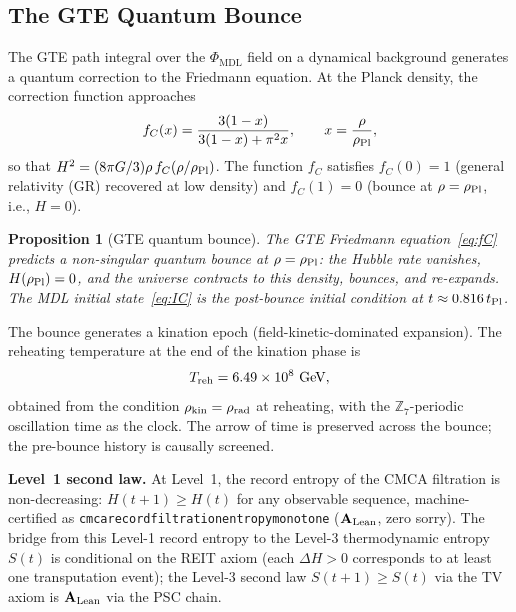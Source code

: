 \documentclass[11pt]{article}
\newtheorem{proposition}[theorem]{Proposition}
\theoremstyle{remark}
\newcommand{\PHIMDL}{\Phi_{\mathrm{MDL}}}
\newcommand{\ZS}{\mathbb{Z}_7}
\newcommand{\lean}[1]{%
  \penalty-100
  \begingroup\def\_{\textunderscore\allowbreak}\texttt{#1}\endgroup}
\newcommand{\rhoPl}{\rho_{\rm Pl}}
\newcommand{\CatAL}{\ensuremath{\textbf{A}_{\rm Lean}}}
\begin{document}
\subsection{The GTE Quantum Bounce}
\label{sec:bounce}

The GTE path integral over the $\PHIMDL$ field on a dynamical background generates
a quantum correction to the Friedmann equation.  At the Planck density, the correction
function approaches
\begin{equation}
  f_C(x) = \frac{3(1-x)}{3(1-x)+\pi^2 x}, \qquad x = \frac{\rho}{\rhoPl},
  \label{eq:fC}
\end{equation}
so that $H^2 = (8\pi G/3)\rho\,f_C(\rho/\rhoPl)$.  The function $f_C$ satisfies
$f_C(0)=1$ (general relativity (GR) recovered at low density) and $f_C(1) = 0$ (bounce at $\rho=\rhoPl$,
i.e., $H=0$).

\begin{proposition}[GTE quantum bounce]
\label{prop:bounce}
The GTE Friedmann equation~\eqref{eq:fC} predicts a non-singular quantum bounce at
$\rho = \rhoPl$: the Hubble rate vanishes, $H(\rho_{\rm Pl})=0$, and the universe
contracts to this density, bounces, and re-expands.  The MDL initial state~\eqref{eq:IC}
is the post-bounce initial condition at $t\approx 0.816\,t_{\rm Pl}$.
\end{proposition}



The bounce generates a kination epoch (field-kinetic-dominated expansion).  The
reheating temperature at the end of the kination phase is~\cite{SpivackPhiMDLGravity}
\begin{equation}
  T_{\rm reh} = 6.49\times10^{8}~\text{GeV},
  \label{eq:Treh}
\end{equation}
obtained from the condition $\rho_{\rm kin} = \rho_{\rm rad}$ at reheating, with the
$\ZS$-periodic oscillation time as the clock.  The arrow of time is preserved across
the bounce; the pre-bounce history is causally screened.

\smallskip\noindent\textbf{Level~1 second law.}\enspace
At Level~1, the record entropy of the CMCA filtration is non-decreasing:
$H(t{+}1) \geq H(t)$ for any observable sequence, machine-certified as
\lean{cmca\_record\_filtration\_entropy\_monotone} ($\CatAL$, zero sorry).  The bridge
from this Level-1 record entropy to the Level-3 thermodynamic entropy $S(t)$ is
conditional on the REIT axiom (each $\Delta H > 0$ corresponds to at least one
transputation event); the Level-3 second law $S(t{+}1)\geq S(t)$ via the TV axiom
is $\CatAL$ via the PSC chain.
\end{document}
